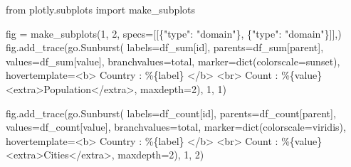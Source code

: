 \documentclass[
  letterpaper,
  DIV=11,
  numbers=noendperiod]{scrartcl}
\newenvironment{Shaded}{\begin{snugshade}}{\end{snugshade}}
\newcommand{\BuiltInTok}[1]{\textcolor[rgb]{0.00,0.23,0.31}{#1}}
\newcommand{\DecValTok}[1]{\textcolor[rgb]{0.68,0.00,0.00}{#1}}
\newcommand{\ImportTok}[1]{\textcolor[rgb]{0.00,0.46,0.62}{#1}}
\newcommand{\NormalTok}[1]{\textcolor[rgb]{0.00,0.23,0.31}{#1}}
\newcommand{\OperatorTok}[1]{\textcolor[rgb]{0.37,0.37,0.37}{#1}}
\newcommand{\SpecialCharTok}[1]{\textcolor[rgb]{0.37,0.37,0.37}{#1}}
\newcommand{\StringTok}[1]{\textcolor[rgb]{0.13,0.47,0.30}{#1}}
\begin{document}
\begin{Shaded}
\begin{Highlighting}[]
\ImportTok{from}\NormalTok{ plotly.subplots }\ImportTok{import}\NormalTok{ make\_subplots}

\NormalTok{fig }\OperatorTok{=}\NormalTok{ make\_subplots(}\DecValTok{1}\NormalTok{, }\DecValTok{2}\NormalTok{, specs}\OperatorTok{=}\NormalTok{[[\{}\StringTok{"type"}\NormalTok{: }\StringTok{"domain"}\NormalTok{\}, \{}\StringTok{"type"}\NormalTok{: }\StringTok{"domain"}\NormalTok{\}]],)}
\NormalTok{fig.add\_trace(go.Sunburst(}
\NormalTok{    labels}\OperatorTok{=}\NormalTok{df\_sum[}\StringTok{\textquotesingle{}id\textquotesingle{}}\NormalTok{],}
\NormalTok{    parents}\OperatorTok{=}\NormalTok{df\_sum[}\StringTok{\textquotesingle{}parent\textquotesingle{}}\NormalTok{],}
\NormalTok{    values}\OperatorTok{=}\NormalTok{df\_sum[}\StringTok{\textquotesingle{}value\textquotesingle{}}\NormalTok{],}
\NormalTok{    branchvalues}\OperatorTok{=}\StringTok{\textquotesingle{}total\textquotesingle{}}\NormalTok{,}
\NormalTok{    marker}\OperatorTok{=}\BuiltInTok{dict}\NormalTok{(colorscale}\OperatorTok{=}\StringTok{\textquotesingle{}sunset\textquotesingle{}}\NormalTok{),}
\NormalTok{    hovertemplate}\OperatorTok{=}\StringTok{\textquotesingle{}\textless{}b\textgreater{} Country : \%}\SpecialCharTok{\{label\}}\StringTok{ \textless{}/b\textgreater{} \textless{}br\textgreater{} Count : \%}\SpecialCharTok{\{value\}}\StringTok{ \textless{}extra\textgreater{}Population\textless{}/extra\textgreater{}\textquotesingle{}}\NormalTok{,}
\NormalTok{    maxdepth}\OperatorTok{=}\DecValTok{2}\NormalTok{), }\DecValTok{1}\NormalTok{, }\DecValTok{1}\NormalTok{)}

\NormalTok{fig.add\_trace(go.Sunburst(}
\NormalTok{    labels}\OperatorTok{=}\NormalTok{df\_count[}\StringTok{\textquotesingle{}id\textquotesingle{}}\NormalTok{],}
\NormalTok{    parents}\OperatorTok{=}\NormalTok{df\_count[}\StringTok{\textquotesingle{}parent\textquotesingle{}}\NormalTok{],}
\NormalTok{    values}\OperatorTok{=}\NormalTok{df\_count[}\StringTok{\textquotesingle{}value\textquotesingle{}}\NormalTok{],}
\NormalTok{    branchvalues}\OperatorTok{=}\StringTok{\textquotesingle{}total\textquotesingle{}}\NormalTok{,}
\NormalTok{    marker}\OperatorTok{=}\BuiltInTok{dict}\NormalTok{(colorscale}\OperatorTok{=}\StringTok{\textquotesingle{}viridis\textquotesingle{}}\NormalTok{),}
\NormalTok{    hovertemplate}\OperatorTok{=}\StringTok{\textquotesingle{}\textless{}b\textgreater{} Country : \%}\SpecialCharTok{\{label\}}\StringTok{ \textless{}/b\textgreater{} \textless{}br\textgreater{} Count : \%}\SpecialCharTok{\{value\}}\StringTok{ \textless{}extra\textgreater{}Cities\textless{}/extra\textgreater{}\textquotesingle{}}\NormalTok{,}
\NormalTok{    maxdepth}\OperatorTok{=}\DecValTok{2}\NormalTok{), }\DecValTok{1}\NormalTok{, }\DecValTok{2}\NormalTok{)}


\end{Highlighting}
\end{Shaded}
\end{document}
